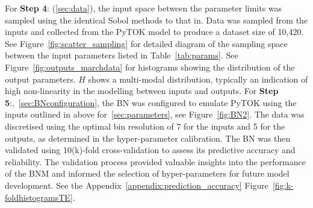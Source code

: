 \documentclass[journal]{IEEEtran}
\begin{document}
For \textbf{Step 4}: (\ref{sec:data}), the input space between the parameter limits was sampled using the identical Sobol methods to that in\cite{Griffiths2024}. Data was sampled from the inputs and collected from the PyTOK model to produce a dataset size of 10,420. See Figure~\ref{fig:scatter_sampling} for detailed diagram of the sampling space between the input parameters listed in Table~\ref{tab:params}. See Figure~\ref{fig:outputs_marchdata} for histograms showing the distribution of the output parameters. $H$ shows a multi-modal distribution, typically an indication of high non-linearity in the modelling between inputs and outputs. 
For \textbf{Step 5}:,~\ref{sec:BNconfiguration}, the BN was configured to emulate PyTOK using the inputs outlined in above for~\ref{sec:parameters}, see Figure~\ref{fig:BN2}. The data was discretised using the optimal bin resolution of 7 for the inputs and 5 for the outputs, as determined in the hyper-parameter calibration. The BN was then validated using 10(k)-fold cross-validation to assess its predictive accuracy and reliability. The validation process provided valuable insights into the performance of the BNM and informed the selection of hyper-parameters for future model development. See the Appendix~\ref{appendix:prediction_accuracy} Figure~\ref{fig:k-foldhistogramsTE}.
\end{document}
